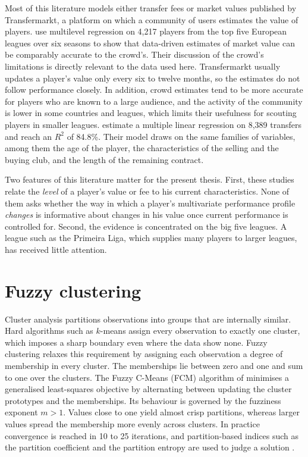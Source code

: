 Most of this literature models either transfer fees or market values published by Transfermarkt, a platform on which a community of users estimates the value of players.  use multilevel regression on 4,217 players from the top five European leagues over six seasons to show that data-driven estimates of market value can be comparably accurate to the crowd's. Their discussion of the crowd's limitations is directly relevant to the data used here. Transfermarkt usually updates a player's value only every six to twelve months, so the estimates do not follow performance closely. In addition, crowd estimates tend to be more accurate for players who are known to a large audience, and the activity of the community is lower in some countries and leagues, which limits their usefulness for scouting players in smaller leagues.  estimate a multiple linear regression on 8,389 transfers and reach an $R^2$ of 84.8\%. Their model draws on the same families of variables, among them the age of the player, the characteristics of the selling and the buying club, and the length of the remaining contract.

Two features of this literature matter for the present thesis. First, these studies relate the \emph{level} of a player's value or fee to his current characteristics. None of them asks whether the way in which a player's multivariate performance profile \emph{changes} is informative about changes in his value once current performance is controlled for. Second, the evidence is concentrated on the big five leagues. A league such as the Primeira Liga, which supplies many players to larger leagues, has received little attention.

\section{Fuzzy clustering}
\label{sec:lit-fuzzy}

Cluster analysis partitions observations into groups that are internally similar. Hard algorithms such as $k$-means assign every observation to exactly one cluster, which imposes a sharp boundary even where the data show none. Fuzzy clustering relaxes this requirement by assigning each observation a degree of membership in every cluster. The memberships lie between zero and one and sum to one over the clusters. The Fuzzy C-Means (FCM) algorithm of  minimises a generalised least-squares objective by alternating between updating the cluster prototypes and the memberships. Its behaviour is governed by the fuzziness exponent $m>1$. Values close to one yield almost crisp partitions, whereas larger values spread the membership more evenly across clusters. In practice convergence is reached in 10 to 25 iterations, and partition-based indices such as the partition coefficient and the partition entropy are used to judge a solution \cite{bezdek1984fcm}.

